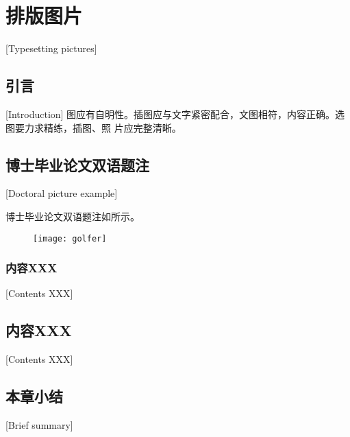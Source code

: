 
\chapter{排版图片}[Typesetting pictures]

\section{引言}[Introduction]
图应有自明性。插图应与文字紧密配合，文图相符，内容正确。选图要力求精练，插图、照
片应完整清晰。

\section{博士毕业论文双语题注}[Doctoral picture example]

博士毕业论文双语题注如所示。

\begin{figure}[htpb]
\centering
\texttt{[image: golfer]}
\end{figure}

\subsection{内容XXX}[Contents XXX]

\lipsum[3]

\section{内容XXX}[Contents XXX]

\lipsum[2]

\section{本章小结}[Brief summary]

\lipsum[1]

